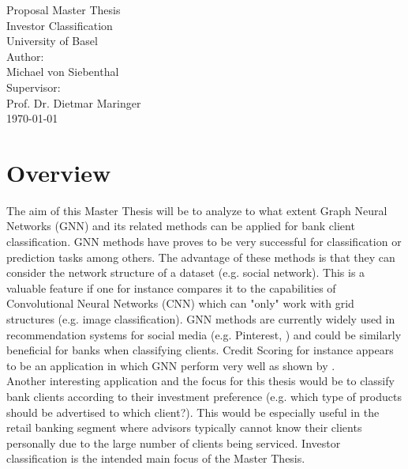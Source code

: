\documentclass[12pt,a4paper]{article}
\begin{document}
	\begin{center}
	\vspace{1em}
	\large{Proposal Master Thesis}\\
	\huge Investor Classification \\ 
	\large \vspace{1em}
	University of Basel\\
	\vspace{4em}
	\large
	Author: \\
	Michael von Siebenthal\\
	\vspace{2em}
	Supervisor: \\
	Prof. Dr. Dietmar Maringer\\
	\vspace{2em}
	\today
	\vspace{3em}
	\end{center}
	\thispagestyle{empty}
	\pagebreak
	\tableofcontents
	\pagebreak
	\onehalfspacing
	\setlength\abovedisplayskip{2.5pt}
	\setlength\belowdisplayskip{2.5pt}
	
	\section{Overview}
		
	The aim of this Master Thesis will be to analyze to what extent Graph Neural Networks (GNN) and its related methods \citep{kipf2016semi,hamilton2017inductive,velivckovic2017graph,vaswani2017attention} 
	can be applied for bank client classification. GNN methods have proves to be very successful for classification or prediction tasks among others. 
	The advantage of these methods is that they can consider the network structure of a dataset (e.g. social network). This is a valuable feature 
	if one for instance compares it to the capabilities of Convolutional Neural Networks (CNN) which can "only" work with grid structures 
	(e.g. image classification). GNN methods are currently widely used in recommendation systems for social media (e.g. Pinterest, \citet{ying2018graph})
	and could be similarly beneficial for banks when classifying clients. Credit Scoring for instance appears to be an application in which GNN perform 
	very well as shown by \citet{sukharev2020ews}. \\

	\noindent Another interesting application and the focus for this thesis would be to classify bank clients according to their investment preference 
	(e.g. which type of products should be advertised to which client?). This would be especially useful in the retail banking segment where advisors 
	typically cannot know their clients personally due to the large number of clients being serviced. Investor classification is the intended main focus
	of the Master Thesis. \\
\end{document}

